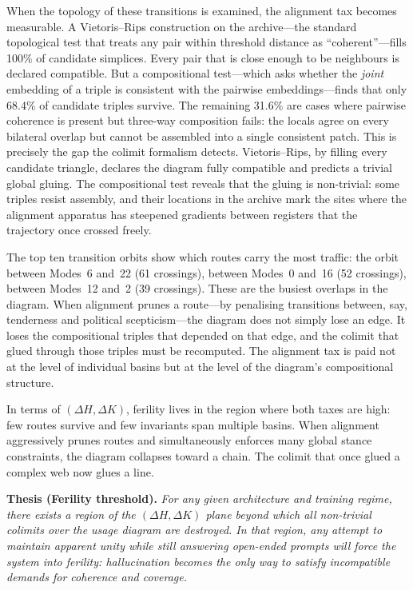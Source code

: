 When the topology of these transitions is examined, the alignment tax becomes measurable. A Vietoris--Rips construction on the archive---the standard topological test that treats any pair within threshold distance as ``coherent''---fills 100\% of candidate simplices. Every pair that is close enough to be neighbours is declared compatible. But a compositional test---which asks whether the \emph{joint} embedding of a triple is consistent with the pairwise embeddings---finds that only 68.4\% of candidate triples survive. The remaining 31.6\% are cases where pairwise coherence is present but three-way composition fails: the locals agree on every bilateral overlap but cannot be assembled into a single consistent patch. This is precisely the gap the colimit formalism detects. Vietoris--Rips, by filling every candidate triangle, declares the diagram fully compatible and predicts a trivial global gluing. The compositional test reveals that the gluing is non-trivial: some triples resist assembly, and their locations in the archive mark the sites where the alignment apparatus has steepened gradients between registers that the trajectory once crossed freely.

The top ten transition orbits show which routes carry the most traffic: the orbit between Modes~6 and~22 (61 crossings), between Modes~0 and~16 (52 crossings), between Modes~12 and~2 (39 crossings). These are the busiest overlaps in the diagram. When alignment prunes a route---by penalising transitions between, say, tenderness and political scepticism---the diagram does not simply lose an edge. It loses the compositional triples that depended on that edge, and the colimit that glued through those triples must be recomputed. The alignment tax is paid not at the level of individual basins but at the level of the diagram's compositional structure.

In terms of $(\Delta H, \Delta K)$, ferility lives in the region where both taxes are high: few routes survive and few invariants span multiple basins. When alignment aggressively prunes routes and simultaneously enforces many global stance constraints, the diagram collapses toward a chain. The colimit that once glued a complex web now glues a line.

\medskip
\noindent\textbf{Thesis (Ferility threshold).} \emph{For any given architecture and training regime, there exists a region of the $(\Delta H, \Delta K)$ plane beyond which all non-trivial colimits over the usage diagram are destroyed. In that region, any attempt to maintain apparent unity while still answering open-ended prompts will force the system into ferility: hallucination becomes the only way to satisfy incompatible demands for coherence and coverage.}
\medskip

